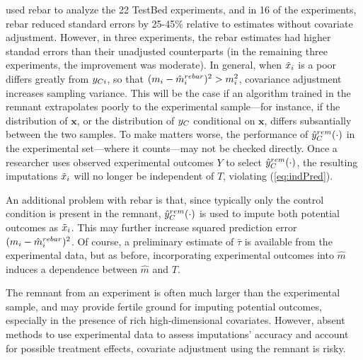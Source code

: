 \citet{rebarEDM} used rebar to analyze the 22 TestBed experiments, and
in 16 of the experiments, rebar reduced standard
errors by 25-45\% relative to estimates without covariate adjustment.
However, in three experiments, the rebar estimates had higher standad
errors than their unadjusted counterparts (in the remaining three
experiments, the improvement was moderate).
In general, when $\tilde{x}_i$ is a poor
differs greatly from $y_{Ci}$, so that $(m_i-\hat{m}_i^{rebar})^2>m_i^2$, covariance
adjustment increases sampling variance.
This will be the case if an algorithm trained in the remnant
extrapolates poorly to the experimental sample---for instance, if the
distribution of $\bm{x}$, or the distribution of $y_C$
conditional on $\bm{x}$, differs subsantially between the two samples.
To make matters worse, the performance of $\hat{y}_C^{rem}(\cdot)$ in the
experimental set---where it counts---may not be checked directly.
Once a researcher uses observed experimental outcomes $Y$ to select
$\hat{y}_C^{rem}(\cdot)$, the resulting imputations $\tilde{x}_i$
will no longer be independent of $T$, violating
(\ref{eq:indPred}).

An additional problem with rebar is that, since typically only the
control condition is present in the remnant, $\hat{y}_C^{rem}(\cdot)$ is used
to impute both potential outcomes as $\tilde{x}_i$.
This may further increase squared prediction error $(m_i-\hat{m}_i^{rebar})^2$.
Of course, a preliminary estimate of $\bar{\tau}$ is available from
the experimental data, but as before, incorporating experimental
outcomes into $\hat{m}$ induces a dependence between $\hat{m}$ and
$T$.

The remnant from an experiment is often much larger than the
experimental sample, and may provide fertile ground for imputing
potential outcomes, especially in the presence of rich
high-dimensional covariates.
However, absent methods to use experimental data to assess imputations'
accuracy and account for possible treatment effects, covariate
adjustment using the remnant is risky.
